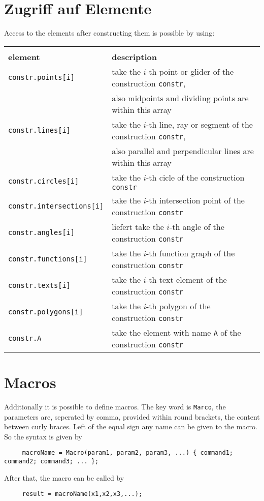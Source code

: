 \documentclass[10pt]{article}
\begin{document}
\section{Zugriff auf Elemente}
Access to the elements after constructing them is possible by using: \\
\begin{tabular}
{|l|l|} \hline \\[-0.75em] {\large
\textbf{element}} & {\large \textbf{description}} \\ \hline\hline
\verb+constr.points[i]+ & take the $i$-th point or glider of the
construction \verb+constr+, \\ & also midpoints and dividing points are within this array \\
\hline\verb+constr.lines[i]+ & take the $i$-th line, ray or
segment of the construction \verb+constr+, \\ & also parallel and
perpendicular lines are within this array
\\
\hline\verb+constr.circles[i]+ & take the $i$-th cicle of the
construction \verb+constr+
\\
\hline\verb+constr.intersections[i]+ & take the $i$-th
intersection point of the construction \verb+constr+
\\
\hline\verb+constr.angles[i]+ & liefert take the $i$-th angle of
the construction \verb+constr+
\\
\hline\verb+constr.functions[i]+ & take the $i$-th function graph
of the construction \verb+constr+
\\
\hline\verb+constr.texts[i]+ & take the $i$-th text element of the
construction \verb+constr+
\\
\hline\verb+constr.polygons[i]+ & take the $i$-th polygon of the
construction \verb+constr+
\\
\hline\verb+constr.A+ & take the element with name \verb'A' of the
construction \verb+constr+
\\ \hline
\end{tabular}

\section{Macros}
Additionally it is possible to define macros. The key word is
\verb+Marco+, the parameters are, seperated by comma, provided
within round brackets, the content between curly braces. Left of
the equal sign any name can be given to the macro. \\ So the
syntax is given by
\begin{verbatim}
     macroName = Macro(param1, param2, param3, ...) { command1; command2; command3; ... };
\end{verbatim}
After that, the macro can be called by
\begin{verbatim}
     result = macroName(x1,x2,x3,...);
\end{verbatim}
\end{document}
